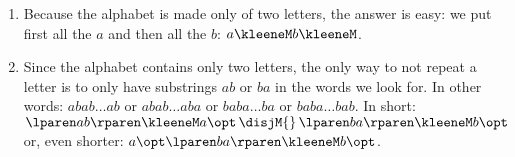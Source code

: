 \begin{enumerate}
  \item Because the alphabet is made only of two letters, the answer
    is easy: we put first all the \(a\) and then all the \(b\):
    \(a\kleeneM b\kleeneM\).

  \item Since the alphabet contains only two letters, the only way to
    not repeat a letter is to only have substrings \(ab\) or \(ba\) in
    the words we look for. In other words: \(abab\ldots ab\) or
    \(abab\ldots aba\) or \(baba\ldots ba\) or \(baba\ldots bab\). In
    short: \(\lparen ab \rparen\kleeneM a\opt \, \disjM{} \, \lparen
    ba \rparen\kleeneM b\opt\) or, even shorter: \(a\opt \lparen ba
    \rparen\kleeneM b\opt\).

\end{enumerate}
